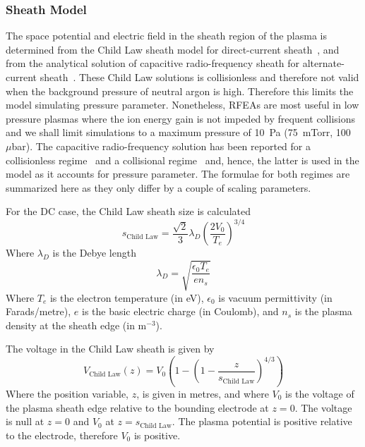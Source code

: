 \subsubsection{\label{SheathModel}Sheath Model}
The space potential and electric field in the sheath region of the plasma is determined from the Child Law sheath model for direct-current sheath~\cite{Lieberman2005}, and from the analytical solution of capacitive radio-frequency sheath for alternate-current sheath~\cite{Lieberman1988,Lieberman1989}. These Child Law solutions is collisionless and therefore not valid when the background pressure of neutral argon is high. Therefore this limits the model simulating pressure parameter. Nonetheless, RFEAs are most useful in low pressure plasmas where the ion energy gain is not impeded by frequent collisions and we shall limit simulations to a maximum pressure of 10~Pa (75~mTorr, 100~$\mu$bar). The capacitive radio-frequency solution has been reported for a collisionless regime~\cite{Lieberman1988} and a collisional regime~\cite{Lieberman1989} and, hence, the latter is used in the model as it accounts for pressure parameter. The formulae for both regimes are summarized here as they only differ by a couple of scaling parameters. 

For the DC case, the Child Law sheath size is calculated 
\begin{equation}
s_\text{Child Law} = \frac{\sqrt{2}}{3} \lambda_D \left( \frac{2 V_0}{T_e} \right)^{3/4}
\end{equation}
Where $\lambda_D$ is the Debye length
\begin{equation}
\lambda_D = \sqrt{ \frac{\epsilon_0 T_e}{e n_s} }
\end{equation}
Where $T_e$ is the electron temperature (in eV), $\epsilon_0$ is vacuum permittivity (in Farads/metre), $e$ is the basic electric charge (in Coulomb), and $n_s$ is the plasma density at the sheath edge (in m$^{-3}$).

The voltage in the Child Law sheath is given by
\begin{equation}
V_\text{Child Law}(z) = V_0 \left( 1 -  \left( 1 -\frac{z}{s_\text{Child Law}} \right)^{4/3} \right)
\end{equation}
Where the position variable, $z$, is given in metres, and where $V_0$ is the voltage of the plasma sheath edge relative to the bounding electrode at $z=0$. The voltage is null at $z=0$ and $V_0$ at $z=s_\text{Child Law}$. The plasma potential is positive relative to the electrode, therefore $V_0$ is positive.

